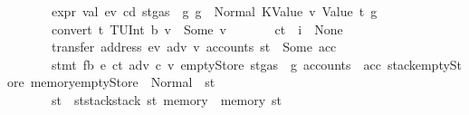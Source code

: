 \begin{isabellebody}
\ \ \ \ \ \ \ {\isachardoublequoteopen}expr\ val\ ev\ cd\ {\isacharparenleft}{\kern0pt}st{\isasymlparr}gas\ {\isacharcolon}{\kern0pt}{\isacharequal}{\kern0pt}\ g{\isasymrparr}{\isacharparenright}{\kern0pt}\ g\ {\isacharequal}{\kern0pt}\ Normal\ {\isacharparenleft}{\kern0pt}{\isacharparenleft}{\kern0pt}KValue\ v{\isacharcomma}{\kern0pt}\ Value\ t{\isacharparenright}{\kern0pt}{\isacharcomma}{\kern0pt}\ g{\isacharprime}{\kern0pt}{\isacharparenright}{\kern0pt}{\isachardoublequoteclose}\isanewline
\ \ \ \ \ \ \ {\isachardoublequoteopen}convert\ t\ {\isacharparenleft}{\kern0pt}TUInt\ b{}{}{}{\isacharparenright}{\kern0pt}\ v\ {\isacharequal}{\kern0pt}\ Some\ v{\isacharprime}{\kern0pt}{\isachardoublequoteclose}\isanewline
\ \ \ \ \ \ \ {\isachardoublequoteopen}ct\ {\isachardollar}{\kern0pt}{\isachardollar}{\kern0pt}\ i\ {\isacharequal}{\kern0pt}\ None{\isachardoublequoteclose}\isanewline
\ \ \ \ \ \ \ {\isachardoublequoteopen}transfer\ {\isacharparenleft}{\kern0pt}address\ ev{\isacharparenright}{\kern0pt}\ adv\ v{\isacharprime}{\kern0pt}\ {\isacharparenleft}{\kern0pt}accounts\ st{\isacharparenright}{\kern0pt}\ {\isacharequal}{\kern0pt}\ Some\ acc{\isachardoublequoteclose}\isanewline
\ \ \ \ \ \ \ {\isachardoublequoteopen}stmt\ fb{\isacharprime}{\kern0pt}\ {\isacharparenleft}{\kern0pt}e{\isacharprime}{\kern0pt}\ ct\ adv\ c\ v{\isacharprime}{\kern0pt}{\isacharparenright}{\kern0pt}\ emptyStore\ {\isacharparenleft}{\kern0pt}st{\isasymlparr}gas\ {\isacharcolon}{\kern0pt}{\isacharequal}{\kern0pt}\ g{\isacharprime}{\kern0pt}{\isacharcomma}{\kern0pt}\ accounts\ {\isacharcolon}{\kern0pt}{\isacharequal}{\kern0pt}\ acc{\isacharcomma}{\kern0pt}\ stack{\isacharcolon}{\kern0pt}{\isacharequal}{\kern0pt}emptyStore{\isacharcomma}{\kern0pt}\ memory{\isacharcolon}{\kern0pt}{\isacharequal}{\kern0pt}emptyStore{\isasymrparr}{\isacharparenright}{\kern0pt}\ {\isacharequal}{\kern0pt}\ Normal\ {\isacharparenleft}{\kern0pt}{\isacharparenleft}{\kern0pt}{\isacharparenright}{\kern0pt}{\isacharcomma}{\kern0pt}\ st{\isacharprime}{\kern0pt}{\isacharprime}{\kern0pt}{\isacharparenright}{\kern0pt}{\isachardoublequoteclose}\isanewline
\ \ \ \ \ \ \ {\isachardoublequoteopen}st{\isacharprime}{\kern0pt}\ {\isacharequal}{\kern0pt}\ st{\isacharprime}{\kern0pt}{\isacharprime}{\kern0pt}{\isasymlparr}stack{\isacharcolon}{\kern0pt}{\isacharequal}{\kern0pt}stack\ st{\isacharcomma}{\kern0pt}\ memory\ {\isacharcolon}{\kern0pt}{\isacharequal}{\kern0pt}\ memory\ st{\isasymrparr}{\isachardoublequoteclose}\isanewline

\end{isabellebody}
